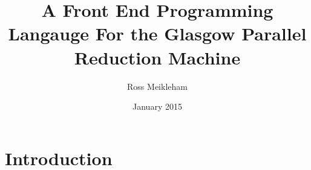 \documentclass{l4proj}
\begin{document}
\title{A Front End Programming Langauge For the Glasgow Parallel Reduction Machine}
\author{Ross Meikleham}
\date{January 2015}
\maketitle

\begin{abstract}

\end{abstract}

\educationalconsent
%
%
\tableofcontents

\chapter{Introduction}












\end{document}
